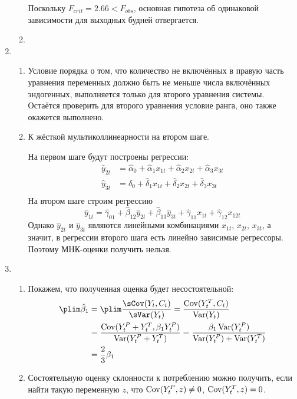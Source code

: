 \begin{enumerate}
\begin{enumerate}
Поскольку $F_{crit} = 2.66 < F_{obs}$, основная гипотеза об одинаковой зависимости
для выходных будней отвергается.
\item
\end{enumerate}
\item
\begin{enumerate}
\item Условие порядка о том, что количество не включённых в правую часть
уравнения переменных должно быть не меньше числа включённых эндогенных, выполняется только
для второго уравнения системы.
Остаётся проверить для второго уравнения условие ранга,
оно также окажется выполнено.
\item К жёсткой мультиколлинеарности на втором шаге.

На первом шаге будут построены регрессии:
\begin{align*}
\hat{y}_{2t} &= \hat{\alpha}_{0} + \hat{\alpha}_1 x_{1t} + \hat{\alpha}_2 x_{2t} + \hat{\alpha}_3 x_{3t} \\
\hat{y}_{3t} &= \hat{\delta}_{0} + \hat{\delta}_1 x_{1t} + \hat{\delta}_2 x_{2t} + \hat{\delta}_3 x_{3t} \\
\end{align*}
На втором шаге строим регрессию
\[
\hat{y}_{1t} = \hat{\gamma}_{01} + \hat{\beta}_{12} \hat{y}_{2t} + \hat{\beta}_{13} \hat{y}_{3t} + \hat{\gamma}_{11} x_{1t} + \hat{\gamma}_{12} x_{12t}
\]
Однако $\hat{y}_{2t}$ и $\hat{y}_{3t}$ являются линейными комбинациями $x_{1t}$,
$x_{2t}$, $x_{3t}$, а значит, в регрессии второго шага есть линейно зависимые регрессоры.
Поэтому МНК-оценки получить нельзя.
\end{enumerate}
\item
\begin{enumerate}
\item Покажем, что полученная оценка будет несостоятельной:
\begin{align*}
\plim \hat \beta_1 &= \plim \frac{\sCov(Y_t, C_t)}{\sVar(Y_t)} = \frac{\Cov(Y^T_t, C_t)}{\Var(Y_t)} \\
&= \frac{\Cov(Y_t^P + Y_t^T, \beta_1 Y_t^P)}{\Var(Y_t^P + Y_t^T)} = \frac{\beta_1 \Var(Y_t^P)}{\Var(Y_t^P) + \Var(Y_t^T)} \\
&= \frac{2}{3} \beta_1
\end{align*}
\item Состоятельную оценку склонности к потреблению можно получить,
если найти такую переменную $z$, что $\operatorname{Cov}(Y^P_t, z) \neq 0$, $\operatorname{Cov}(Y^T_t, z) = 0$.
\end{enumerate}
\end{enumerate}
